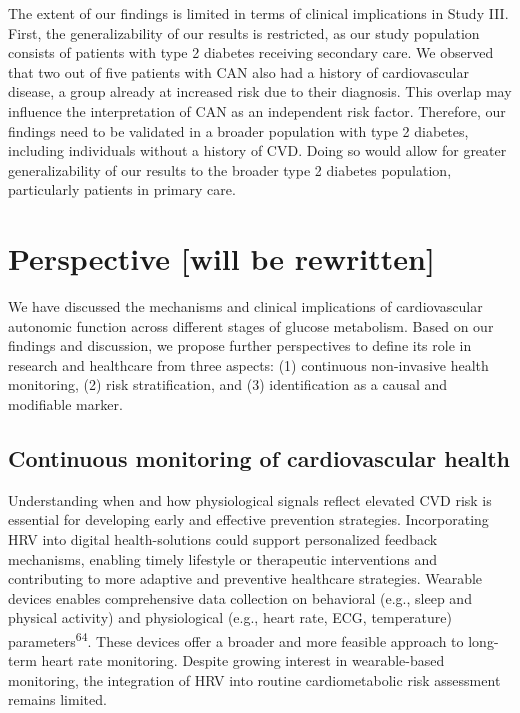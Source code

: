 \documentclass[
  a4paper,
  headsepline=true,
  open=any]{scrbook}
\begin{document}
The extent of our findings is limited in terms of clinical implications
in Study III. First, the generalizability of our results is restricted,
as our study population consists of patients with type 2 diabetes
receiving secondary care. We observed that two out of five patients with
CAN also had a history of cardiovascular disease, a group already at
increased risk due to their diagnosis. This overlap may influence the
interpretation of CAN as an independent risk factor. Therefore, our
findings need to be validated in a broader population with type 2
diabetes, including individuals without a history of CVD. Doing so would
allow for greater generalizability of our results to the broader type 2
diabetes population, particularly patients in primary care.


\hypertarget{perspective-will-be-rewritten}{%
\chapter{Perspective {[}will be
rewritten{]}}\label{perspective-will-be-rewritten}}

We have discussed the mechanisms and clinical implications of
cardiovascular autonomic function across different stages of glucose
metabolism. Based on our findings and discussion, we propose further
perspectives to define its role in research and healthcare from three
aspects: (1) continuous non-invasive health monitoring, (2) risk
stratification, and (3) identification as a causal and modifiable
marker.

\hypertarget{continuous-monitoring-of-cardiovascular-health}{%
\section{Continuous monitoring of cardiovascular
health}\label{continuous-monitoring-of-cardiovascular-health}}

Understanding when and how physiological signals reflect elevated CVD
risk is essential for developing early and effective prevention
strategies. Incorporating HRV into digital health-solutions could
support personalized feedback mechanisms, enabling timely lifestyle or
therapeutic interventions and contributing to more adaptive and
preventive healthcare strategies. Wearable devices enables comprehensive
data collection on behavioral (e.g., sleep and physical activity) and
physiological (e.g., heart rate, ECG, temperature)
parameters\textsuperscript{64}. These devices offer a broader and more
feasible approach to long-term heart rate monitoring. Despite growing
interest in wearable-based monitoring, the integration of HRV into
routine cardiometabolic risk assessment remains limited.
\end{document}
